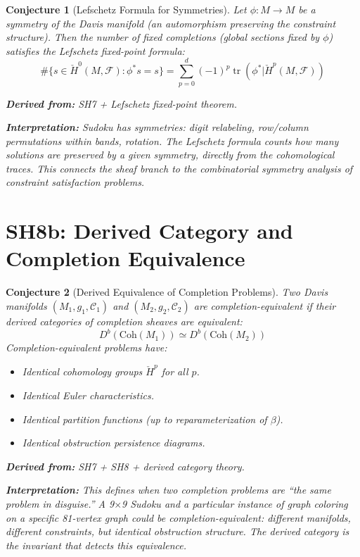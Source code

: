\documentclass[11pt,letterpaper]{article}
\newtheorem{conjecture}{Conjecture}[section]
\newcommand{\tr}{\operatorname{tr}}
\newcommand{\Hcech}{\check{H}}
\newcommand{\sheaf}{\mathcal{F}}
\newcommand{\constraint}{\mathcal{C}}
\begin{document}
\begin{conjecture}[Lefschetz Formula for 
Symmetries]\label{conj:lefschetz}
Let $\phi : M \to M$ be a symmetry of the Davis manifold (an 
automorphism preserving the constraint structure). Then the number 
of fixed completions (global sections fixed by $\phi$) satisfies the 
Lefschetz fixed-point formula:
\begin{equation}\label{eq:lefschetz}
    \#\{s \in \Hcech^0(M, \sheaf) : \phi^* s = s\} = 
    \sum_{p=0}^{d} (-1)^p \tr(\phi^* | \Hcech^p(M, \sheaf))
\end{equation}

\textbf{Derived from:} SH7 + Lefschetz fixed-point theorem.

\textbf{Interpretation:} Sudoku has symmetries: digit relabeling, 
row/column permutations within bands, rotation. The Lefschetz formula 
counts how many solutions are preserved by a given symmetry, directly 
from the cohomological traces. This connects the sheaf branch to the 
combinatorial symmetry analysis of constraint satisfaction problems.
\end{conjecture}

\section{SH8b: Derived Category and Completion Equivalence}

\begin{conjecture}[Derived Equivalence of Completion 
Problems]\label{conj:derived}
Two Davis manifolds $(M_1, g_1, \constraint_1)$ and $(M_2, g_2, 
\constraint_2)$ are \emph{completion-equivalent} if their derived 
categories of completion sheaves are equivalent:
\begin{equation}\label{eq:derived_equiv}
    D^b(\mathrm{Coh}(M_1)) \simeq D^b(\mathrm{Coh}(M_2))
\end{equation}
Completion-equivalent problems have:
\begin{itemize}
    \item Identical cohomology groups $\Hcech^p$ for all $p$.
    \item Identical Euler characteristics.
    \item Identical partition functions (up to reparameterization of 
    $\beta$).
    \item Identical obstruction persistence diagrams.
\end{itemize}

\textbf{Derived from:} SH7 + SH8 + derived category theory.

\textbf{Interpretation:} This defines when two completion problems 
are ``the same problem in disguise.'' A 9$\times$9 Sudoku and a 
particular instance of graph coloring on a specific 81-vertex graph 
could be completion-equivalent: different manifolds, different 
constraints, but identical obstruction structure. The derived category 
is the invariant that detects this equivalence.
\end{conjecture}
\end{document}
